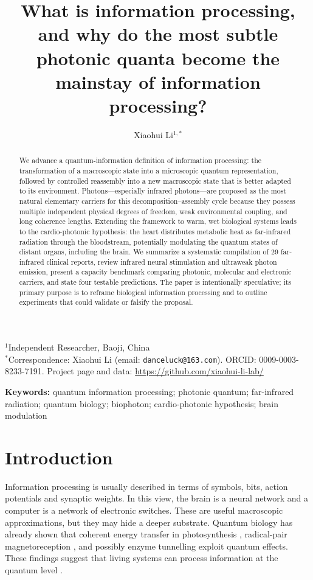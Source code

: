 \documentclass[11pt,a4paper]{article}
\title{\textbf{What is information processing, and why do the most subtle photonic quanta become the mainstay of information processing?}}
\author{Xiaohui Li$^{1,*}$}
\date{}
\begin{document}
\maketitle

\noindent
$^{1}$Independent Researcher, Baoji, China\\
$^{*}$Correspondence: Xiaohui Li (email: \texttt{danceluck@163.com}). ORCID: 0009-0003-8233-7191. Project page and data: \url{https://github.com/xiaohui-li-lab/}

\begin{abstract}
We advance a quantum-information definition of information processing: the transformation of a macroscopic state into a microscopic quantum representation, followed by controlled reassembly into a new macroscopic state that is better adapted to its environment. Photons---especially infrared photons---are proposed as the most natural elementary carriers for this decomposition--assembly cycle because they possess multiple independent physical degrees of freedom, weak environmental coupling, and long coherence lengths. Extending the framework to warm, wet biological systems leads to the cardio-photonic hypothesis: the heart distributes metabolic heat as far-infrared radiation through the bloodstream, potentially modulating the quantum states of distant organs, including the brain. We summarize a systematic compilation of 29 far-infrared clinical reports, review infrared neural stimulation and ultraweak photon emission, present a capacity benchmark comparing photonic, molecular and electronic carriers, and state four testable predictions. The paper is intentionally speculative; its primary purpose is to reframe biological information processing and to outline experiments that could validate or falsify the proposal.
\end{abstract}

\noindent\textbf{Keywords:} quantum information processing; photonic quantum; far-infrared radiation; quantum biology; biophoton; cardio-photonic hypothesis; brain modulation

\section*{Introduction}

Information processing is usually described in terms of symbols, bits, action potentials and synaptic weights. In this view, the brain is a neural network and a computer is a network of electronic switches. These are useful macroscopic approximations, but they may hide a deeper substrate. Quantum biology has already shown that coherent energy transfer in photosynthesis \cite{engel2007}, radical-pair magnetoreception \cite{hore2016}, and possibly enzyme tunnelling \cite{lambert2013} exploit quantum effects. These findings suggest that living systems can process information at the quantum level \cite{abbott2008}.
\end{document}
